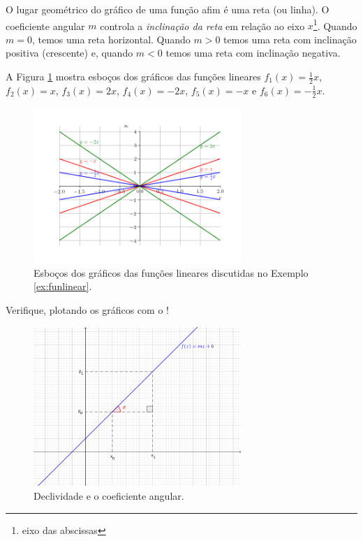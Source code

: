 O lugar geométrico do gráfico de uma função afim é uma reta (ou linha). O coeficiente angular $m$ controla a \emph{inclinação da reta} em relação ao eixo $x$\footnote{eixo das abscissas}. Quando $m=0$, temos uma reta horizontal. Quando $m>0$ temos uma reta com inclinação positiva (crescente) e, quando $m<0$ temos uma reta com inclinação negativa.

\begin{ex}\label{ex:funlinear}
  A Figura \ref{fig:ex_funlinear} mostra esboços dos gráficos das funções lineares $f_1(x)=\frac{1}{2}x$, $f_2(x) = x$, $f_3(x) = 2x$, $f_4(x)=-2x$, $f_5(x)=-x$ e $f_6(x)=-\frac{1}{2}x$.
  
  \begin{figure}[H]
    \centering
    \includegraphics[width=0.7\textwidth]{./cap_funcao/dados/fig_ex_funlinear/fig_ex_funlinear}
    \caption{Esboços dos gráficos das funções lineares discutidas no Exemplo \ref{ex:funlinear}.}
    \label{fig:ex_funlinear}
  \end{figure}

  \ifispython
  Verifique, plotando os gráficos com o {\sympy}!
\end{ex}

\begin{figure}[H]
  \centering
  \includegraphics[width=0.7\textwidth]{./cap_funcao/dados/fig_declividade/fig_declividade}
  \caption{Declividade e o coeficiente angular.}
  \label{fig:declividade}
\end{figure}

